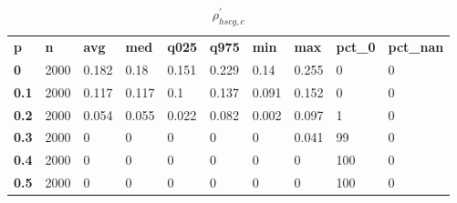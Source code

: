\begin{table}[h]
 \centering 
\footnotesize
\caption{$\rho_{hscg,c}^\prime $}
\label{tab:alphahscgc}
\begin{tabular}[h]{| l l l l l l l l l l|
    } \hline
\textbf{ p} & \textbf{ n} & \textbf{ avg} & \textbf{ med} & \textbf{ q025} & \textbf{ q975} & \textbf{ min} & \textbf{ max} & \textbf{ pct\_0} & \textbf{ pct\_nan}
           \\
  \textbf{  0} & 2000 & 0.182 &  0.18 & 0.151 & 0.229 &  0.14 & 0.255 &   0 & 0
           \\
  \textbf{0.1} & 2000 & 0.117 & 0.117 &   0.1 & 0.137 & 0.091 & 0.152 &   0 & 0
           \\
  \textbf{0.2} & 2000 & 0.054 & 0.055 & 0.022 & 0.082 & 0.002 & 0.097 &   1 & 0
           \\
  \textbf{0.3} & 2000 &     0 &     0 &     0 &     0 &     0 & 0.041 &  99 & 0
           \\
  \textbf{0.4} & 2000 &     0 &     0 &     0 &     0 &     0 &     0 & 100 & 0
           \\
  \textbf{0.5} & 2000 &     0 &     0 &     0 &     0 &     0 &     0 & 100 & 0
           \\
 \hline \end{tabular}
 \end{table}
